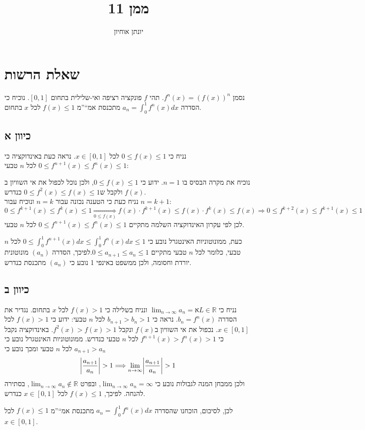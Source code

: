 \documentclass[11pt, oneside]{article}
\title{ממן 11}
\author{יונתן אוחיון}
\newcommand{\qed}{\R{$\blacksquare$}}
\newcommand{\br}{\\\\\\\\\\\\\\}
\newcommand{\logr}[1]{\underset{\text{#1}}{\Longrightarrow}}
\newcommand{\mR}{\mathbb{R}}
\newcommand{\defi}[3]{\int^{#2}_{#1} #3}
\begin{document}
\maketitle
\clearpage

\section*{שאלת הרשות}
נסמן $f^{n}(x) = (f(x))^{n}$. תהי $f$ פונקציה רציפה ואי-שלילית בתחום $[0, 1]$. נוכיח כי הסדרה $a_{n} = \defi{0}{1}{f^{n}(x)dx}$ מתכנסת אמ``''מ $f(x) \le 1$ לכל $x$ בתחום.
\subsection*{כיוון א}
נניח כי $0 \le f(x) \le 1$ לכל $x \in [0, 1]$. נראה כעת באינדוקציה כי $0 \le f^{n + 1}(x) \le f^{n}(x) \le 1$ לכל $n$ טבעי:

נוכיח את מקרה הבסיס בו $n = 1$. ידוע כי $0 \le f(x) \le 1$, ולכן נוכל לכפול את אי השוויון ב$f(x)$ ולקבל ש$0 \le f^{2}(x) \le f(x) \le 1$ כנדרש.\\
נניח כעת כי הטענה נכונה עבור $n = k$ ונוכיח עבור $n = k + 1$:
\[
0 \le f^{k + 1}(x) \le f^{k}(x) \le 1 \logr{$0 \le f(x)$} f(x) \cdot f^{k + 1}(x) \le f(x) \cdot f^{k}(x) \le f(x) \logr{} 0 \le f^{k + 2}(x) \le f^{k + 1}(x) \le 1
\]
לכן לפי עקרון האינדוקציה השלמה מתקיים $0 \le f^{n + 1}(x) \le f^{n}(x) \le 1$ לכל $n$ טבעי.

כעת, ממונוטוניות האינטגרל נובע כי $0 \le \defi{0}{1}{f^{n + 1}(x)dx} \le \defi{0}{1}{f^{n}(x)dx} \le 1$ לכל $n$ טבעי, כלומר לכל $n$ טבעי מתקיים $0 \le a_{n + 1} \le a_{n} \le 1$.לפיכך, הסדרה $(a_{n})$ מונוטונית יורדת וחסומה, ולכן ממשפט באינפי 1 נובע כי $(a_{n})$ מתכנסת כנדרש.

\subsection*{כיוון ב}
נניח כי $\lim_{n \to \infty} a_{n} =א L \in \mR$ ונניח בשלילה כי $f(x) > 1$ לכל $x$ בתחום. נגדיר את הסדרה $b_{n} = f^{n}(x)$. נראה כי $b_{n + 1} > b_{n} > 1$ לכל $n$ טבעי: ידוע כי $f(x) > 1$ לכל $x \in [0, 1]$. נכפול את אי השוויון ב$f(x)$ ונקבל $f^{2}(x) > f(x) > 1$. באינדוקציה נקבל כי $f^{n + 1}(x) > f^{n}(x) > 1$ לכל $n$ טבעי כנדרש. ממונוטוניות האינטגרל נובע כי $a_{n + 1} > a_{n}$ לכל $n$ טבעי ומכך נובע כי
\[
\abs{\frac{a_{n + 1}}{a_{n}}} > 1 \logr{} \lim_{n \to \infty} \abs{\frac{a_{n + 1}}{a_{n}}} > 1
\]
ולכן ממבחן המנה לגבולות נובע כי $\lim_{n \to \infty} a_{n} = \infty$, ובפרט $\lim_{n \to \infty} a_{n} \not\in \mR$, בסתירה להנחה. לפיכך, $f(x) \le 1$ לכל $x \in [0, 1]$ כנדרש.

לכן, לסיכום, הוכחנו שהסדרה $a_{n} = \defi{0}{1}{f^{n}(x)dx}$ מתכנסת אמ``''מ $f(x) \le 1$ לכל $x \in [0, 1]$.
\br\qed
\end{document}
